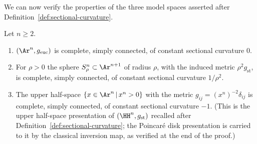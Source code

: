 We can now verify the properties of the three model spaces asserted
after Definition~\ref{def:sectional-curvature}.

\begin{lemma}
\label{lem:model-spaces}

Let $n\ge2$.
\begin{enumerate}
\item $(\Ar^n,g_{\mathrm{euc}})$ is complete, simply connected, of
constant sectional curvature $0$.
\item For $\rho>0$ the sphere $S^n_\rho\subset\Ar^{n+1}$ of radius
$\rho$, with the induced metric $\rho^2g_{\mathrm{st}}$, is
complete, simply connected, of constant sectional curvature
$1/\rho^2$.
\item The upper half-space $\{x\in\Ar^n\,|\,x^n>0\}$ with the
metric $g_{ij}=(x^n)^{-2}\delta_{ij}$ is complete, simply
connected, of constant sectional curvature $-1$. (This is the
upper half-space presentation of $(\HH^n,g_{\mathrm{st}})$
recalled after Definition~\ref{def:sectional-curvature}; the
Poincar\'e disk presentation is carried to it by the classical
inversion map, as verified at the end of the proof.)
\end{enumerate}
\end{lemma}

